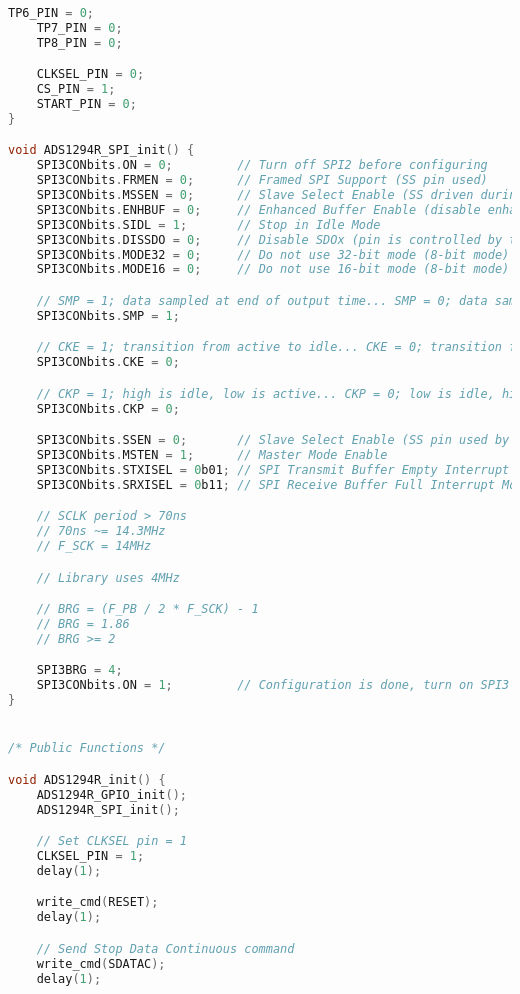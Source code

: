 \begin{lstlisting}[language=C]
    TP6_PIN = 0;
    TP7_PIN = 0;
    TP8_PIN = 0;

    CLKSEL_PIN = 0;
    CS_PIN = 1;
    START_PIN = 0;
}

void ADS1294R_SPI_init() {
    SPI3CONbits.ON = 0;         // Turn off SPI2 before configuring
    SPI3CONbits.FRMEN = 0;      // Framed SPI Support (SS pin used)
    SPI3CONbits.MSSEN = 0;      // Slave Select Enable (SS driven during transmission)
    SPI3CONbits.ENHBUF = 0;     // Enhanced Buffer Enable (disable enhanced buffer)
    SPI3CONbits.SIDL = 1;       // Stop in Idle Mode
    SPI3CONbits.DISSDO = 0;     // Disable SDOx (pin is controlled by this module)
    SPI3CONbits.MODE32 = 0;     // Do not use 32-bit mode (8-bit mode)
    SPI3CONbits.MODE16 = 0;     // Do not use 16-bit mode (8-bit mode)

    // SMP = 1; data sampled at end of output time... SMP = 0; data sampled at middle of output time
    SPI3CONbits.SMP = 1;

    // CKE = 1; transition from active to idle... CKE = 0; transition from idle to active
    SPI3CONbits.CKE = 0;

    // CKP = 1; high is idle, low is active... CKP = 0; low is idle, high is active
    SPI3CONbits.CKP = 0;

    SPI3CONbits.SSEN = 0;       // Slave Select Enable (SS pin used by module)
    SPI3CONbits.MSTEN = 1;      // Master Mode Enable
    SPI3CONbits.STXISEL = 0b01; // SPI Transmit Buffer Empty Interrupt Mode (generated when the buffer is completely empty)
    SPI3CONbits.SRXISEL = 0b11; // SPI Receive Buffer Full Interrupt Mode (generated when the buffer is full)

    // SCLK period > 70ns
    // 70ns ~= 14.3MHz
    // F_SCK = 14MHz

    // Library uses 4MHz

    // BRG = (F_PB / 2 * F_SCK) - 1
    // BRG = 1.86
    // BRG >= 2

    SPI3BRG = 4;
    SPI3CONbits.ON = 1;         // Configuration is done, turn on SPI3 peripheral
}


/* Public Functions */

void ADS1294R_init() {
    ADS1294R_GPIO_init();
    ADS1294R_SPI_init();

    // Set CLKSEL pin = 1
    CLKSEL_PIN = 1;
    delay(1);

    write_cmd(RESET);
    delay(1);

    // Send Stop Data Continuous command
    write_cmd(SDATAC);
    delay(1);


\end{lstlisting}
